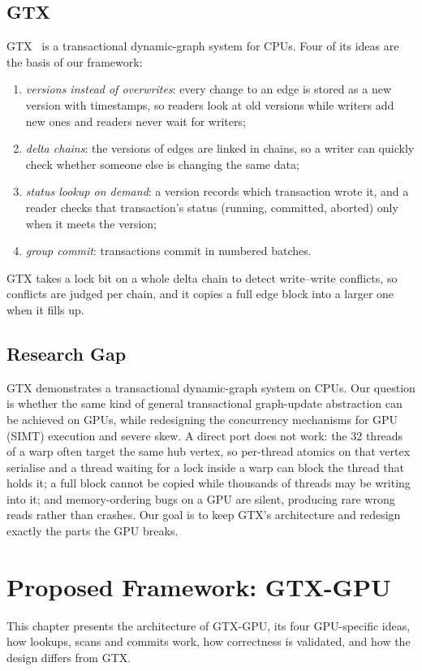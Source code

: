 \documentclass[11pt,a4paper,oneside]{report}
\newcommand{\sys}{GTX-GPU}
\begin{document}
\section{GTX}
GTX~\cite{gtx} is a transactional dynamic-graph system for CPUs. Four of its ideas are the basis of our framework:
\begin{enumerate}
\item \emph{versions instead of overwrites}: every change to an edge is stored as a new version with timestamps, so
  readers look at old versions while writers add new ones and readers never wait for writers;
\item \emph{delta chains}: the versions of edges are linked in chains, so a writer can quickly check whether someone else
  is changing the same data;
\item \emph{status lookup on demand}: a version records which transaction wrote it, and a reader checks that
  transaction's status (running, committed, aborted) only when it meets the version;
\item \emph{group commit}: transactions commit in numbered batches.
\end{enumerate}
GTX takes a lock bit on a whole delta chain to detect write--write conflicts, so conflicts are judged per chain, and it
copies a full edge block into a larger one when it fills up.

\section{Research Gap}
GTX demonstrates a transactional dynamic-graph system on CPUs. Our question is whether the same kind of general
transactional graph-update abstraction can be achieved on GPUs, while redesigning the concurrency mechanisms for GPU
(SIMT) execution and severe skew. A direct port does not work: the 32 threads of a warp often target the same hub
vertex, so per-thread atomics on that vertex serialise and a thread waiting for a lock inside a warp can block the
thread that holds it; a full block cannot be copied while thousands of threads may be writing into it; and
memory-ordering bugs on a GPU are silent, producing rare wrong reads rather than crashes. Our goal is to keep GTX's
architecture and redesign exactly the parts the GPU breaks.

\chapter{Proposed Framework: GTX-GPU}
\label{ch:framework}
This chapter presents the architecture of \sys{}, its four GPU-specific ideas, how lookups, scans and commits work, how
correctness is validated, and how the design differs from GTX.
\end{document}
